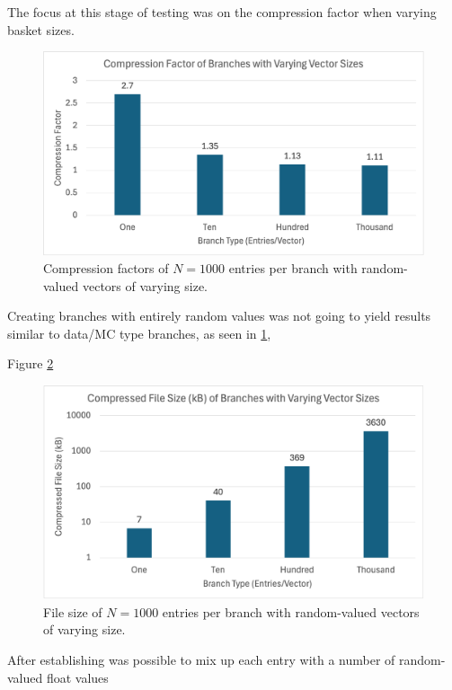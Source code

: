 The focus at this stage of testing was on the compression factor when varying basket sizes. 


\begin{figure}[h]\label{fig:toymodel_compF_rndm_vectors}
    \caption{Compression factors of $N=1000$ entries per branch with random-valued vectors of varying size.}
    \centering
    \includegraphics[width=.8\textwidth]{content/toymodel_content/branch_compfacts_nomix.png}
\end{figure}




Creating branches with entirely random values was not going to yield results similar to data/MC type branches, as seen in \ref{fig:toymodel_compF_rndm_vectors}, 

Figure \ref{fig:toymodel_filesize_rndm_vectors} 

\begin{figure}[h]\label{fig:toymodel_filesize_rndm_vectors}
    \caption{File size of $N=1000$ entries per branch with random-valued vectors of varying size.}
    \centering
    \includegraphics[width=.8\textwidth]{content/toymodel_content/branch_fileSize_nomix.png}
\end{figure}

After establishing  was possible to mix up each entry with a number of random-valued float values 
